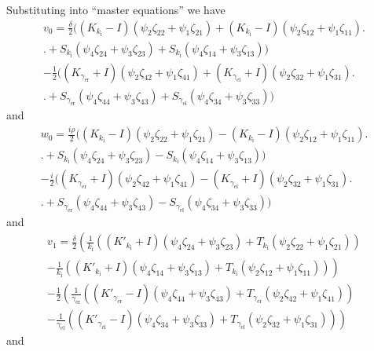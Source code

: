 Substituting into ``master equations'' we have
\begin{multline*}
  v_0 = \frac{\delta}{2}\bigl((K_{k_\text{i}}-I)(\psi_2 \zeta_{22}+\psi_1 \zeta_{21})+(K_{k_\text{i}}-I)(\psi_2 \zeta_{12}+\psi_1 \zeta_{11})\bigr.\\
  \bigl.+S_{k_\text{i}} (\psi_4 \zeta_{24}+\psi_3 \zeta_{23})+S_{k_\text{i}} (\psi_4 \zeta_{14}+\psi_3 \zeta_{13})\bigr)\\
  -\frac{1}{2}\bigl((K_{\gamma_\text{er}} + I)(\psi_2 \zeta_{42}+\psi_1 \zeta_{41}) +(K_{\gamma_\text{el}} + I)(\psi_2 \zeta_{32}+\psi_1 \zeta_{31})\bigr.\\
  \bigl.+S_{\gamma_\text{er}} (\psi_4 \zeta_{44}+\psi_3 \zeta_{43})+S_{\gamma_\text{el}} (\psi_4 \zeta_{34}+\psi_3 \zeta_{33})\bigr)
\end{multline*}
and
\begin{multline*}
  w_0 = \frac{i \rho}{2}\bigl((K_{k_\text{i}}-I)(\psi_2 \zeta_{22}+\psi_1 \zeta_{21}) -(K_{k_\text{i}}-I)(\psi_2 \zeta_{12}+\psi_1 \zeta_{11})\bigr.\\
  \bigl.+S_{k_\text{i}} (\psi_4 \zeta_{24}+\psi_3 \zeta_{23})-S_{k_\text{i}} (\psi_4 \zeta_{14}+\psi_3 \zeta_{13})\bigr)\\
  -\frac{i}{2}\bigl((K_{\gamma_\text{er}}+I)(\psi_2 \zeta_{42}+\psi_1 \zeta_{41}) -(K_{\gamma_\text{el}}+I)(\psi_2 \zeta_{32}+\psi_1 \zeta_{31}) \bigr.\\
  \bigl.+S_{\gamma_\text{er}} (\psi_4 \zeta_{44}+\psi_3 \zeta_{43})-S_{\gamma_\text{el}} (\psi_4 \zeta_{34}+\psi_3 \zeta_{33})\bigr)
\end{multline*}
and
\begin{multline*}
  v_1 = \frac{\delta}{2}\left(\frac{1}{k_\text{i}}\left((K'_{k_\text{i}}+I)(\psi_4 \zeta_{24}+\psi_3 \zeta_{23}) +T_{k_\text{i}} (\psi_2 \zeta_{22}+\psi_1 \zeta_{21})\right)\right.\\
  \left.-\frac{1}{k_\text{i}}\left((K'_{k_\text{i}}+I)(\psi_4 \zeta_{14}+\psi_3 \zeta_{13}) +T_{k_\text{i}} (\psi_2 \zeta_{12}+\psi_1 \zeta_{11})\right)\right)\\
  -\frac{1}{2}\left(\frac{1}{\gamma_\text{er}}\left((K'_{\gamma_\text{er}}-I)(\psi_4 \zeta_{44}+\psi_3 \zeta_{43}) +T_{\gamma_\text{er}} (\psi_2 \zeta_{42}+\psi_1 \zeta_{41})\right)\right.\\
  \left.-\frac{1}{\gamma_\text{el}}\left((K'_{\gamma_\text{el}}-I)(\psi_4 \zeta_{34}+\psi_3 \zeta_{33}) +T_{\gamma_\text{el}} (\psi_2 \zeta_{32}+\psi_1 \zeta_{31})\right)\right)
\end{multline*}
and
